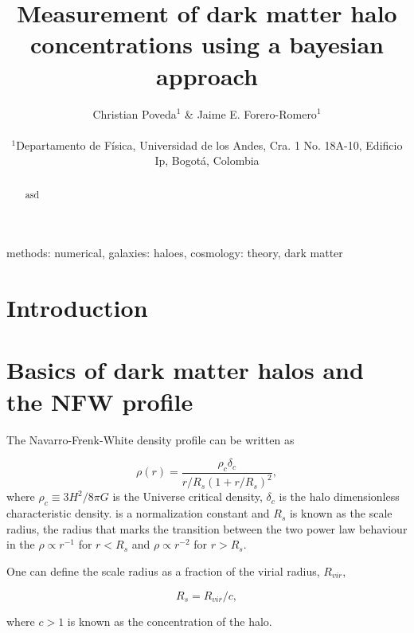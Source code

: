 \documentclass[useAMS,usenatbib]{mn2e}
\begin{document}
\title[Bayesian halo concentration]{Measurement of dark matter halo concentrations using a bayesian approach}
\author[Poveda \& Forero-Romero]{
\parbox[t]{\textwidth}{\raggedright
  Christian Poveda$^{1}$ \&
  Jaime E. Forero-Romero$^{1}$
}
\vspace*{6pt}\\
$^{1}$Departamento de F\'{i}sica, Universidad de los Andes, Cra. 1
No. 18A-10, Edificio Ip, Bogot\'a, Colombia\\
}
\maketitle

\begin{abstract}
asd
\end{abstract}
\begin{keywords}
methods: numerical, galaxies: haloes, cosmology: theory, dark
matter
\end{keywords}


\section{Introduction}
\label{sec:introduction}


\citep{NFW}


\section{Basics of dark matter halos and the NFW profile}
\label{sec:basics}

The Navarro-Frenk-White density profile can be written as

\begin{equation}
\rho(r) = \frac{\rho_c\delta_c}{r/R_s(1+r/R_s)^2}, 
\end{equation}
%
where $\rho_c\equiv 3H^2/8\pi G$ is the Universe critical density,
$\delta_c$ is the halo dimensionless characteristic density. is a
normalization constant and $R_s$ is known as the scale radius, the
radius that marks the transition between the two power law behaviour
in the $\rho\propto r^{-1}$ for $r<R_s$ and $\rho\propto r^{-2}$ for
$r>R_s$. 

One can define the scale radius as a fraction of the virial radius,
$R_{vir}$,

\begin{equation}
R_s = R_{vir}/c,
\end{equation}

where $c>1$ is known as the concentration of the halo.
\end{document}
